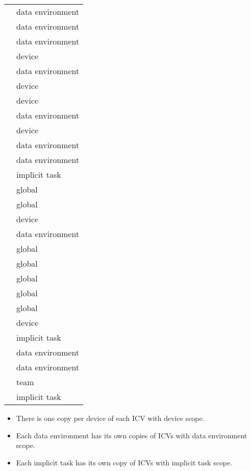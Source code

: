 \begin{supertabular}{p{1.5in} p{2.5in}}
{}               & data environment\\
{}          & data environment\\
{}         & data environment\\
{}         & device\\
{}              & data environment\\
{}         & device\\
{}       & device\\
{}      & data environment\\
{} & device\\
{}     & data environment\\
{}            & data environment\\
{}   & implicit task\\
{}            & global\\
{}  & global \\
{}   & device \\
{}    & data environment\\
{}    & global\\
{} & global\\
{}              & global\\
{}    & global\\
{}             & global \\
{}         & device \\
{}        & implicit task \\
{}        & data environment \\
{}     & data environment \\
{}         & team \\
{}     & implicit task\\
\end{supertabular}

\linenumbers

\descr
\begin{itemize}
\item There is one copy per device of each ICV with device scope.
\item Each data environment has its own copies of ICVs with data environment scope.
\item Each implicit task has its own copy of ICVs with implicit task scope.
\end{itemize}

